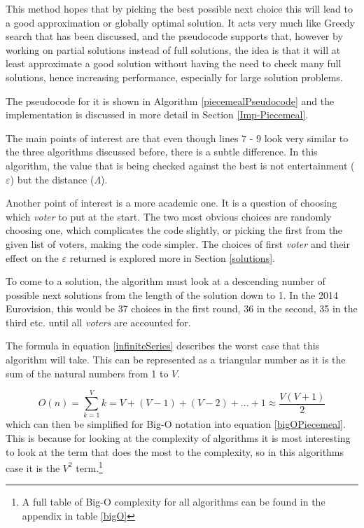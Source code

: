 \documentclass[12pt]{report}
\begin{document}
This method hopes that by picking the best possible next choice this will lead to a good approximation or globally optimal solution. It acts very much like Greedy search that has been discussed, and the pseudocode supports that, however by working on partial solutions instead of full solutions, the idea is that it will at least approximate a good solution without having the need to check many full solutions, hence increasing performance, especially for large solution problems.

The pseudocode for it is shown in Algorithm \ref{piecemealPseudocode} and the implementation is discussed in more detail in Section \ref{Imp-Piecemeal}.

The main points of interest are that even though lines 7 - 9 look very similar to the three algorithms discussed before, there is a subtle difference. In this algorithm, the value that is being checked against the best is not entertainment ($\varepsilon$) but the distance ($\Lambda$).

Another point of interest is a more academic one. It is a question of choosing which \textit{voter} to put at the start. The two most obvious choices are randomly choosing one, which complicates the code slightly, or picking the first from the given list of voters, making the code simpler. The choices of first \textit{voter} and their effect on the $\varepsilon$ returned is explored more in Section \ref{solutions}.

To come to a solution, the algorithm must look at a descending number of possible next solutions from the length of the solution down to 1. In the 2014 Eurovision, this would be 37 choices in the first round, 36 in the second, 35 in the third etc. until all \textit{voters} are accounted for.

The formula in equation \ref{infiniteSeries} describes the worst case that this algorithm will take. This can be represented as a triangular number\cite{triangularNumber} as it is the sum of the natural numbers from 1 to $V$.

\begin{equation}\label{infiniteSeries}
	O(n) = \sum_{k=1}^{V} k =  V + (V-1) + (V-2) + ... + 1 \approx \frac{V(V+1)}{2}
\end{equation}
which can then be simplified for Big-O notation into equation \ref{bigOPiecemeal}. This is because for looking at the complexity of algorithms it is most interesting to look at the term that does the most to the complexity, so in this algorithms case it is the $V^2$ term.\footnote{A full table of Big-O complexity for all algorithms can be found in the appendix in table \ref{bigO}}
\end{document}
